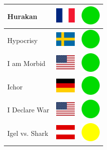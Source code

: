 \documentclass[12pt, a4paper, twoside]{report}
\begin{document}
\begin{center}
\begin{longtable}{|p{5cm}|p{2cm}|p{2cm}|}
 Hurakan                                                    & \includegraphics[width=1cm]{../4x3/fr} &   \includegraphics[width=1cm]{../likes/y} \\ \hline
 Hypocrisy                                                  & \includegraphics[width=1cm]{../4x3/se} &   \includegraphics[width=1cm]{../likes/y} \\ \hline
 I am Morbid                                                & \includegraphics[width=1cm]{../4x3/us} &   \includegraphics[width=1cm]{../likes/y} \\ \hline
 Ichor                                                      & \includegraphics[width=1cm]{../4x3/de} &   \includegraphics[width=1cm]{../likes/y} \\ \hline
 I Declare War                                              & \includegraphics[width=1cm]{../4x3/us} &   \includegraphics[width=1cm]{../likes/y} \\ \hline
 Igel vs. Shark                                             & \includegraphics[width=1cm]{../4x3/at} &   \includegraphics[width=1cm]{../likes/m} \\ \hline

\end{longtable}
\end{center}
\end{document}
